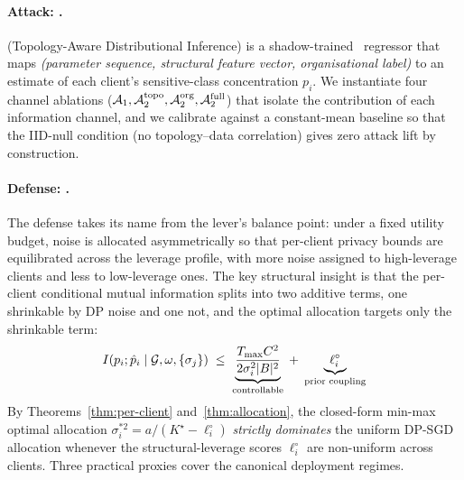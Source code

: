 \paragraph{Attack: \TADI.}
\TADI (Topology-Aware Distributional Inference) is a
shadow-trained~\cite{shokri2017membership} regressor that maps
\emph{(parameter sequence, structural feature vector, organisational
label)} to an estimate of each client's sensitive-class concentration
$p_i$. We instantiate four channel ablations
($\mathcal{A}_1, \mathcal{A}_2^{\text{topo}}, \mathcal{A}_2^{\text{org}}, \mathcal{A}_2^{\text{full}}$)
that isolate the contribution of each information channel, and we
calibrate against a constant-mean baseline so that the IID-null
condition (no topology--data correlation) gives zero attack lift by
construction.

\paragraph{Defense: \Fulcrum.}
The defense takes its name from the lever's balance point: under a
fixed utility budget, noise is allocated asymmetrically so that
per-client privacy bounds are equilibrated across the leverage profile,
with more noise assigned to high-leverage clients and less to
low-leverage ones. The key structural insight is that the per-client
conditional mutual information splits into two additive terms, one
shrinkable by DP noise and one not, and the optimal allocation targets
only the shrinkable term:
\begin{equation*}
I(p_i;\hat{p}_i \mid \mathcal{G},\omega,\{\sigma_j\})
\;\leq\;
\underbrace{\frac{T_{\max} C^2}{2\sigma_i^2 |B|^2}}_{\text{controllable}}
\;+\;
\underbrace{\ell_i^\circ}_{\text{prior coupling}}
\end{equation*}
By Theorems~\ref{thm:per-client} and~\ref{thm:allocation}, the
closed-form min-max optimal allocation
$\sigma_i^{*2} = a/(K^\star - \ell_i^\circ)$ \emph{strictly dominates}
the uniform DP-SGD allocation whenever the structural-leverage scores
$\ell_i^\circ$ are non-uniform across clients. Three practical proxies
cover the canonical deployment regimes.


